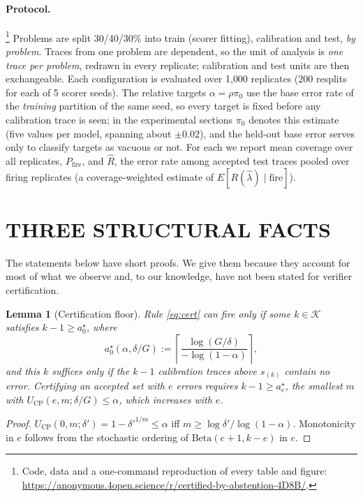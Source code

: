 \documentclass[twoside]{article}
\newtheorem{lemma}{Lemma}
\theoremstyle{remark}
\newcommand{\Rsel}{R}
\newcommand{\lamhat}{\hat\lambda}
\newcommand{\Ucp}{U_{\mathrm{CP}}}
\newcommand{\pizero}{\pi_0}
\newcommand{\pfire}{P_{\mathrm{fire}}}
\begin{document}
\paragraph{Protocol.}\footnote{Code, data and a one-command reproduction of every table and figure: \url{https://anonymous.4open.science/r/certified-by-abstention-4D8B/}.} Problems are split 30/40/30\% into train (scorer fitting), calibration and test, \emph{by problem}. Traces from one problem are dependent, so the unit of analysis is \emph{one trace per problem}, redrawn in every replicate; calibration and test units are then exchangeable. Each configuration is evaluated over 1{,}000 replicates (200 resplits for each of 5 scorer seeds). The relative targets $\alpha=\rho\pizero$ use the base error rate of the \emph{training} partition of the same seed, so every target is fixed before any calibration trace is seen; in the experimental sections $\pizero$ denotes this estimate (five values per model, spanning about $\pm0.02$), and the held-out base error serves only to classify targets as vacuous or not. For each we report mean coverage over all replicates, $\pfire$, and $\hat R$, the error rate among accepted test traces pooled over firing replicates (a coverage-weighted estimate of $E[\Rsel(\lamhat)\mid\text{fire}]$).

\section{THREE STRUCTURAL FACTS}
\label{sec:theory}

The statements below have short proofs. We give them because they account for most of what we observe and, to our knowledge, have not been stated for verifier certification.

\begin{lemma}[Certification floor]
\label{lem:floor}
Rule \eqref{eq:cert} can fire only if some $k\in\mathcal K$ satisfies $k-1\ge a^\star_0$, where
\[
a^\star_0(\alpha,\delta/G):=\left\lceil \frac{\log (G/\delta)}{-\log(1-\alpha)}\right\rceil ,
\]
and this $k$ suffices only if the $k-1$ calibration traces above $s_{(k)}$ contain no error. Certifying an accepted set with $e$ errors requires $k-1\ge a^\star_e$, the smallest $m$ with $\Ucp(e,m;\delta/G)\le\alpha$, which increases with $e$.
\end{lemma}

\begin{proof}
$\Ucp(0,m;\delta')=1-\delta'^{1/m}\le\alpha$ iff $m\ge\log\delta'/\log(1-\alpha)$. Monotonicity in $e$ follows from the stochastic ordering of $\mathrm{Beta}(e+1,k-e)$ in $e$.
\end{proof}
\end{document}
